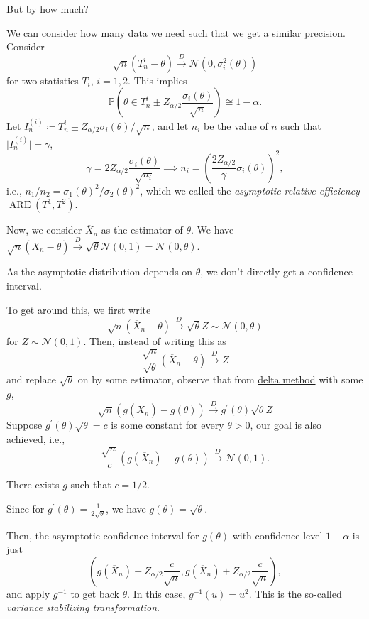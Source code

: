 \begin{problem*}
	But by how much?
\end{problem*}
\begin{answer}
	We can consider how many data we need such that we get a similar precision. Consider
	\[
		\sqrt{n} (T_n^i - \theta )
		\overset{D}{\to} \mathcal{N} (0, \sigma _i^2(\theta ))
	\]
	for two statistics \(T_i\), \(i = 1, 2\). This implies
	\[
		\mathbb{P} \left( \theta \in T_n^i \pm Z_{\alpha / 2} \frac{\sigma _i(\theta )}{\sqrt{n} } \right) \cong 1 - \alpha .
	\]
	Let \(I_n^{(i)} \coloneqq T_n^i \pm Z_{\alpha / 2} \sigma _i(\theta ) / \sqrt{n} \), and let \(n_i\) be the value of \(n\) such that \(\vert I_n^{(i)} \vert = \gamma \),
	\[
		\gamma = 2 Z_{\alpha / 2} \frac{\sigma _i(\theta )}{\sqrt{n_i} }
		\implies n_i = \left( \frac{2 Z_{\alpha / 2}}{\gamma } \sigma _i(\theta ) \right)^2 ,
	\]
	i.e., \(n_1 / n_2 = \sigma _1(\theta )^2 / \sigma _2(\theta )^2\), which we called the \emph{asymptotic relative efficiency} \(\operatorname{ARE}(T^1, T^2) \).
\end{answer}

Now, we consider \(\overline{X} _n\) as the estimator of \(\theta \). We have \(\sqrt{n} (\overline{X} _n - \theta ) \overset{D}{\to} \sqrt{\theta } \mathcal{N} (0, 1) = \mathcal{N} (0, \theta )\).

\begin{note}
	As the asymptotic distribution depends on \(\theta \), we don't directly get a confidence interval.
\end{note}

To get around this, we first write
\[
	\sqrt{n} (\overline{X} _n - \theta )
	\overset{D}{\to} \sqrt{\theta } Z \sim \mathcal{N} (0, \theta )
\]
for \(Z \sim \mathcal{N} (0, 1)\). Then, instead of writing this as
\[
	\frac{\sqrt{n} }{\sqrt{\theta } } (\overline{X} _n - \theta ) \overset{D}{\to} Z
\]
and replace \(\sqrt{\theta } \) on by some estimator, observe that from \hyperref[thm:delta-method]{delta method} with some \(g\),
\[
	\sqrt{n} (g(\overline{X} _n) - g(\theta )) \overset{D}{\to} g^{\prime} (\theta ) \sqrt{\theta } Z
\]
Suppose \(g^{\prime} (\theta ) \sqrt{\theta } = c \) is some constant for every \(\theta > 0\), our goal is also achieved, i.e.,
\[
	\frac{\sqrt{n}}{c} (g(\overline{X} _n) - g(\theta )) \overset{D}{\to} \mathcal{N} (0, 1).
\]

\begin{claim}
	There exists \(g\) such that \(c = 1 / 2\).
\end{claim}
\begin{explanation}
	Since for \(g^{\prime} (\theta ) = \frac{1}{2 \sqrt{\theta } }\), we have \(g(\theta ) = \sqrt{\theta } \).
\end{explanation}

Then, the asymptotic confidence interval for \(g(\theta )\) with confidence level \(1 - \alpha \) is just
\[
	\left( g(\overline{X} _n) - Z_{\alpha / 2} \frac{c}{\sqrt{n} } , g(\overline{X} _n) + Z_{\alpha / 2} \frac{c}{\sqrt{n} } \right),
\]
and apply \(g^{-1} \) to get back \(\theta \). In this case, \(g^{-1} (u) = u^2\). This is the so-called \emph{variance stabilizing transformation}.